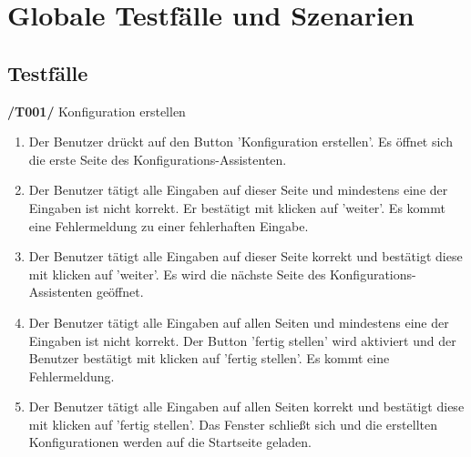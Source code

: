 
\section{Globale Testfälle und Szenarien}

\subsection{Testfälle}



\textbf{/T001/} Konfiguration erstellen
\begin{enumerate}
\item {}
{Der Benutzer drückt auf den Button 'Konfiguration erstellen'.}
{Es öffnet sich die erste Seite des Konfigurations-Assistenten.}

\item {}
{Der Benutzer tätigt alle Eingaben auf dieser Seite und mindestens eine der Eingaben ist nicht korrekt. Er bestätigt mit klicken auf 'weiter'.}
{Es kommt eine Fehlermeldung zu einer fehlerhaften Eingabe.}

\item {}
{Der Benutzer tätigt alle Eingaben auf dieser Seite korrekt und bestätigt diese mit klicken auf 'weiter'.}
{Es wird die nächste Seite des Konfigurations-Assistenten geöffnet.}

\item {}
{Der Benutzer tätigt alle Eingaben auf allen Seiten und mindestens eine der Eingaben ist nicht korrekt. Der Button 'fertig stellen' wird aktiviert und der Benutzer bestätigt mit klicken auf 'fertig stellen'.}
{Es kommt eine Fehlermeldung.}

\item {}
{Der Benutzer tätigt alle Eingaben auf allen Seiten korrekt und bestätigt diese mit klicken auf 'fertig stellen'.}
{Das Fenster schließt sich und die erstellten Konfigurationen werden auf die Startseite geladen.}


\end{enumerate}

